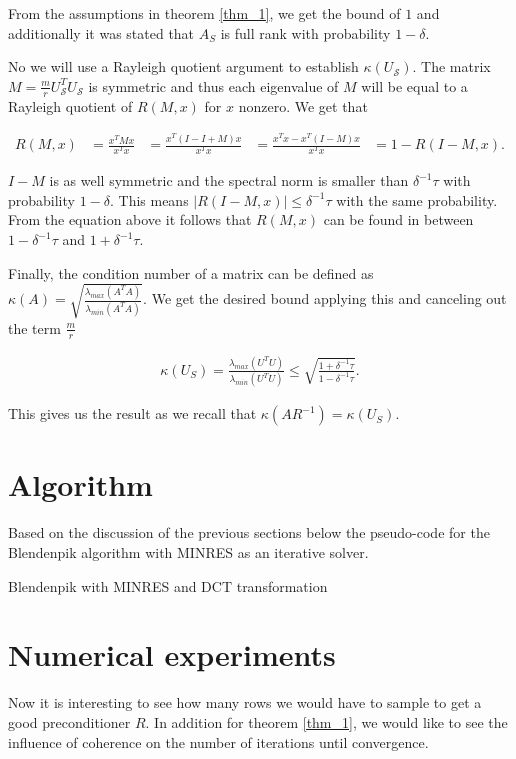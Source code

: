 \documentclass{article}
\begin{document}
From the assumptions in theorem \ref{thm_1}, we get the bound of $1$ and
additionally it was stated that $A_S$ is full rank with probability $1 -
\delta$.

No we will use a Rayleigh quotient argument to establish
$\kappa (U_\mathcal{S})$. The matrix $M=\frac{m}{r}U_\mathcal{S}^TU_\mathcal{S}$ is
symmetric and thus each eigenvalue of $M$ will be equal to a Rayleigh quotient
of $R(M, x)$ for $x$ nonzero. We get that

\begin{align*}
	R(M, x) &= \frac{x^TMx}{x^Tx}
	&= \frac{x^T(I - I + M)x}{x^Tx}
	&= \frac{x^Tx - x^T(I - M)x}{x^Tx}
	&= 1 - R(I-M, x) .
\end{align*}

$I - M$ is as well symmetric and the spectral norm is smaller than $\delta^{-1}
\tau$ with probability $1-\delta$. This means $\left|R(I-M, x)\right| \leq
\delta^{-1}\tau$ with the same probability. From the equation above it follows
that $R(M, x)$ can be found in between $1 - \delta^{-1}\tau$ and $1 +
\delta^{-1}\tau$.

Finally, the condition number of a matrix can be
defined as $\kappa(A) = \sqrt{\frac{\lambda_{max}(A^TA)}{\lambda_{min}(A^TA)}}$.
We get the desired bound applying this and canceling out the term $\frac{m}{r}$ 

\begin{align*}
	\kappa(U_{S}) = \frac{\lambda_{max}(U^TU)}{\lambda_{min}(U^TU)}
	\leq \sqrt{\frac{1+\delta^{-1} \tau}{1-\delta^{-1} \tau}}.
\end{align*}

This gives us the result as we recall that $\kappa(AR^{-1}) = \kappa(U_{S})$.

\section{Algorithm} \label{algo}
Based on the discussion of the previous sections below the pseudo-code for the
Blendenpik algorithm with MINRES as an iterative solver.

\begin{algorithm}[htb]
\caption{Blendenpik with MINRES and DCT transformation}
\end{algorithm}

\section{Numerical experiments} \label{num_exp}
Now it is interesting to see how many rows we would have to sample
to get a good preconditioner $R$. In addition for theorem \ref{thm_1}, we would like to
see the influence of coherence on the number of iterations until convergence. 
\end{document}
